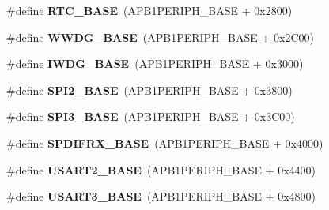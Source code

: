 \begin{DoxyCompactItemize}
\item 
\#define {\bfseries R\+T\+C\+\_\+\+B\+A\+SE}~(A\+P\+B1\+P\+E\+R\+I\+P\+H\+\_\+\+B\+A\+SE + 0x2800)\hypertarget{group___peripheral__memory__map_ga4265e665d56225412e57a61d87417022}{}\label{group___peripheral__memory__map_ga4265e665d56225412e57a61d87417022}

\item 
\#define {\bfseries W\+W\+D\+G\+\_\+\+B\+A\+SE}~(A\+P\+B1\+P\+E\+R\+I\+P\+H\+\_\+\+B\+A\+SE + 0x2\+C00)\hypertarget{group___peripheral__memory__map_ga9a5bf4728ab93dea5b569f5b972cbe62}{}\label{group___peripheral__memory__map_ga9a5bf4728ab93dea5b569f5b972cbe62}

\item 
\#define {\bfseries I\+W\+D\+G\+\_\+\+B\+A\+SE}~(A\+P\+B1\+P\+E\+R\+I\+P\+H\+\_\+\+B\+A\+SE + 0x3000)\hypertarget{group___peripheral__memory__map_ga8543ee4997296af5536b007cd4748f55}{}\label{group___peripheral__memory__map_ga8543ee4997296af5536b007cd4748f55}

\item 
\#define {\bfseries S\+P\+I2\+\_\+\+B\+A\+SE}~(A\+P\+B1\+P\+E\+R\+I\+P\+H\+\_\+\+B\+A\+SE + 0x3800)\hypertarget{group___peripheral__memory__map_gac3e357b4c25106ed375fb1affab6bb86}{}\label{group___peripheral__memory__map_gac3e357b4c25106ed375fb1affab6bb86}

\item 
\#define {\bfseries S\+P\+I3\+\_\+\+B\+A\+SE}~(A\+P\+B1\+P\+E\+R\+I\+P\+H\+\_\+\+B\+A\+SE + 0x3\+C00)\hypertarget{group___peripheral__memory__map_gae634fe8faa6922690e90fbec2fc86162}{}\label{group___peripheral__memory__map_gae634fe8faa6922690e90fbec2fc86162}

\item 
\#define {\bfseries S\+P\+D\+I\+F\+R\+X\+\_\+\+B\+A\+SE}~(A\+P\+B1\+P\+E\+R\+I\+P\+H\+\_\+\+B\+A\+SE + 0x4000)\hypertarget{group___peripheral__memory__map_gad0c89d1e156c49602ce73483b74c2b6a}{}\label{group___peripheral__memory__map_gad0c89d1e156c49602ce73483b74c2b6a}

\item 
\#define {\bfseries U\+S\+A\+R\+T2\+\_\+\+B\+A\+SE}~(A\+P\+B1\+P\+E\+R\+I\+P\+H\+\_\+\+B\+A\+SE + 0x4400)\hypertarget{group___peripheral__memory__map_gade83162a04bca0b15b39018a8e8ec090}{}\label{group___peripheral__memory__map_gade83162a04bca0b15b39018a8e8ec090}

\item 
\#define {\bfseries U\+S\+A\+R\+T3\+\_\+\+B\+A\+SE}~(A\+P\+B1\+P\+E\+R\+I\+P\+H\+\_\+\+B\+A\+SE + 0x4800)\hypertarget{group___peripheral__memory__map_gabe0d6539ac0026d598274ee7f45b0251}{}\label{group___peripheral__memory__map_gabe0d6539ac0026d598274ee7f45b0251}


\end{DoxyCompactItemize}
